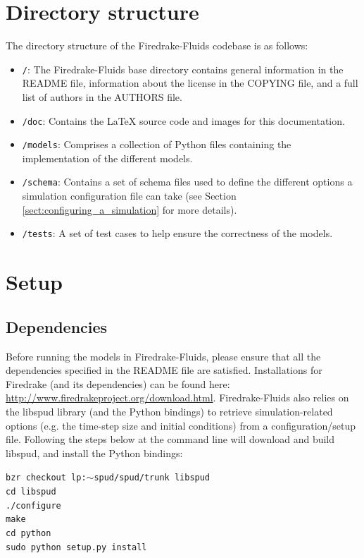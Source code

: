 \documentclass[a4paper,11pt]{report}
\begin{document}
\section{Directory structure}
The directory structure of the Firedrake-Fluids codebase is as follows:
\begin{itemize}
   \item \texttt{/}: The Firedrake-Fluids base directory contains general information in the README file, information about the license in the COPYING file, and a full list of authors in the AUTHORS file.
   \item \texttt{/doc}: Contains the LaTeX source code and images for this documentation.
   \item \texttt{/models}: Comprises a collection of Python files containing the implementation of the different models.
   \item \texttt{/schema}: Contains a set of schema files used to define the different options a simulation configuration file can take (see Section \ref{sect:configuring_a_simulation} for more details).
   \item \texttt{/tests}: A set of test cases to help ensure the correctness of the models.
\end{itemize}

\section{Setup}
\subsection{Dependencies}
Before running the models in Firedrake-Fluids, please ensure that all the dependencies specified in the README file are satisfied. Installations for Firedrake (and its dependencies) can be found here: \url{http://www.firedrakeproject.org/download.html}. Firedrake-Fluids also relies on the libspud library (and the Python bindings) to retrieve simulation-related options (e.g. the time-step size and initial conditions) from a configuration/setup file. Following the steps below at the command line will download and build libspud, and install the Python bindings:

\texttt{bzr checkout lp:$\sim$spud/spud/trunk libspud}\\
\texttt{cd libspud}\\
\texttt{./configure}\\
\texttt{make}\\
\texttt{cd python}\\
\texttt{sudo python setup.py install}
\end{document}
